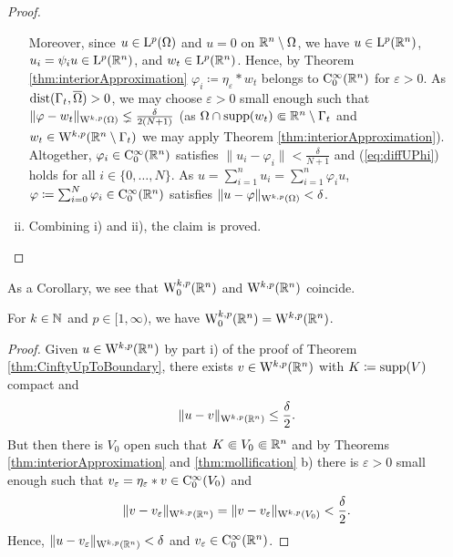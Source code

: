 \begin{proof}
\begin{enumerate}[i)]
      Moreover, since $u \in \mathrm{L}^p(\Omega)$ and $u = 0$ on $\mathbb{R}^n \setminus \Omega$, we have $u \in \mathrm{L}^p(\mathbb{R}^n)$, $u_i = \psi_i u \in \mathrm{L}^p(\mathbb{R}^n)$, and $w_t \in \mathrm{L}^p(\mathbb{R}^n)$.
      Hence, by Theorem \ref{thm:interiorApproximation} $\varphi_i \coloneqq \eta_\varepsilon \ast w_t$ belongs to $\mathrm{C}_0^\infty(\mathbb{R}^n)$ for $\varepsilon > 0$.
      As $\operatorname{dist}(\Gamma_t , \overline\Omega) > 0$, we may choose $\varepsilon > 0$ small enough such that $\|\varphi - w_t \|_{\mathrm{W}^{k,p}(\Omega)} \lneq \frac{\delta}{2(N+1)}$ (as $\Omega \cap \operatorname{supp}(w_t) \Subset \mathbb{R}^n \setminus \Gamma_t$ and $w_t \in \mathrm{W}^{k,p}(\mathbb{R}^n \setminus \Gamma_t)$ we may apply Theorem \ref{thm:interiorApproximation}).
      Altogether, $\varphi_i \in \mathrm{C}_0^\infty(\mathbb{R}^n)$ satisfies $\|u_i - \varphi_i\| < \frac{\delta}{N + 1}$ and (\ref{eq:diffUPhi}) holds for all $i \in \{0,\dots,N\}$.
      As $u = \sum_{i = 1}^n u_i = \sum_{i = 1}^n \varphi_i u$, $\varphi \coloneqq \sum_{i = 0}^N \varphi_i \in \mathrm{C}_0^\infty(\mathbb{R}^n)$ satisfies $\| u - \varphi \|_{\mathrm{W}^{k,p}(\Omega)} < \delta$.
    \item Combining i) and ii), the claim is proved.  \qedhere
  \end{enumerate}
\end{proof}

As a Corollary, we see that $\mathrm{W}_0^{k,p}(\mathbb{R}^n)$ and $\mathrm{W}^{k,p}(\mathbb{R}^n)$ coincide.

\begin{cor}
  For $k \in \mathbb{N}$ and $p \in [1,\infty)$, we have $\mathrm{W}_0^{k,p}(\mathbb{R}^n) = \mathrm{W}^{k,p}(\mathbb{R}^n)$.
\end{cor}

\begin{proof}
  Given $u \in \mathrm{W}^{k,p}(\mathbb{R}^n)$ by part i) of the proof of Theorem \ref{thm:CinftyUpToBoundary}, there exists $v \in\mathrm{W}^{k,p}(\mathbb{R}^n)$ with $K\coloneqq \operatorname{supp}(V)$ compact and $$\|u - v\|_{\mathrm{W}^{k,p}(\mathbb{R}^n)} \leq \frac{\delta}{2}.$$
  But then there is $V_0$ open such that $K \Subset V_0 \Subset \mathbb{R}^n$ and by Theorems \ref{thm:interiorApproximation} and \ref{thm:mollification} b) there is $\varepsilon > 0$ small enough such that $v_\varepsilon = \eta_\varepsilon \ast v \in \mathrm{C}_0^\infty(V_0)$ and 
  $$
  \|v - v_\varepsilon\|_{\mathrm{W}^{k,p}(\mathbb{R}^n)} = \|v - v_\varepsilon\|_{\mathrm{W}^{k,p}(V_0)} < \frac{\delta}{2}.
  $$
  Hence, $\|u - v_\varepsilon\|_{\mathrm{W}^{k,p}(\mathbb{R}^n)} < \delta$ and $v_\varepsilon \in \mathrm{C}_0^\infty(\mathbb{R}^n)$.
\end{proof}

